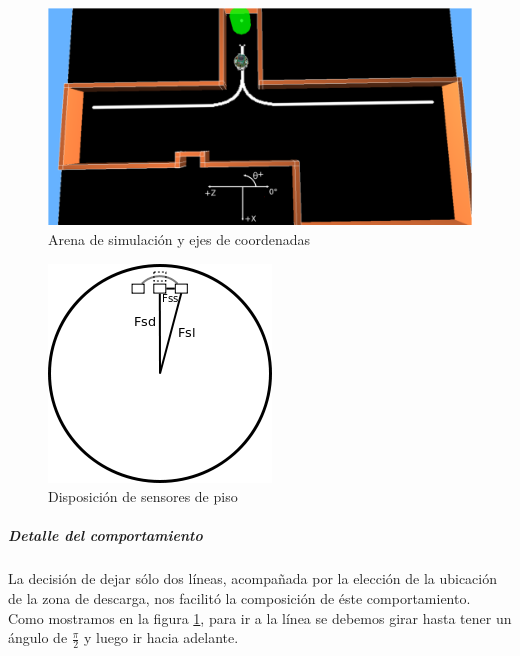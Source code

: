 \begin{figure}[htp]
\begin{center}
\includegraphics[scale=0.3]{comportamientos/figures/arenafinal.png}
\caption{Arena de simulaci\'on y ejes de coordenadas}
\label{fig:arenafinal}
\end{center}
\end{figure}

\begin{figure}[htp]
\begin{center}
\includegraphics[scale=1.0]{comportamientos/figures/floorSensors.png}
\caption{Disposici\'on de sensores de piso}
\label{fig:floorSensors}
\end{center}
\end{figure}

\subparagraph{Detalle del comportamiento}
La decisi\'on de dejar s\'olo dos l\'ineas, acompa\~nada por la elecci\'on de
la ubicaci\'on de la zona de descarga, nos facilit\'o la composici\'on de
\'este comportamiento.
\\\indent Como mostramos en la figura \ref{fig:arenafinal}, para ir a la l\'inea se
debemos girar hasta tener un \'angulo de $\frac{\pi}{2}$ y luego ir hacia
adelante.


